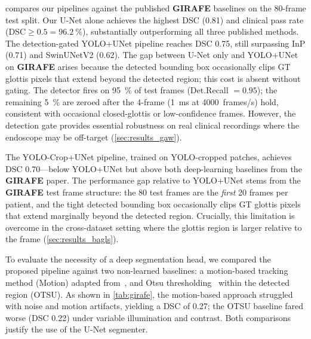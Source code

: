 \documentclass[preprint,12pt]{elsarticle}
\newcommand{\girafe}{\textbf{GIRAFE}}
\newcommand{\yolounet}{YOLO+UNet}
\newcommand{\yolocrop}{YOLO-Crop+UNet}
\begin{document}
 compares our pipelines against the published \girafe{}
baselines on the \num{80}-frame test split.
Our U-Net alone achieves the highest DSC (\num{0.81}) and clinical pass
rate (DSC${\geq}0.5 = \SI{96.2}{\%}$), substantially outperforming all
three published methods.
The detection-gated \yolounet{} pipeline reaches DSC \num{0.75},
still surpassing InP (\num{0.71}) and SwinUNetV2 (\num{0.62}).
The gap between U-Net only and \yolounet{} on \girafe{} arises because the
detected bounding box occasionally clips GT glottis pixels that extend beyond
the detected region; this cost is absent without gating.
The detector fires on \SI{95}{\%} of test frames (Det.Recall $= 0.95$);
the remaining \SI{5}{\%} are zeroed after the 4-frame (\SI{1}{ms} at \SI{4000}{frames/s}) hold, consistent with
occasional closed-glottis or low-confidence frames.
However, the detection gate provides essential robustness on real clinical
recordings where the endoscope may be off-target (\cref{sec:results_gaw}).

The \yolocrop{} pipeline, trained on YOLO-cropped patches, achieves DSC
\num{0.70}---below \yolounet{} but above both deep-learning baselines from
the \girafe{} paper.
The performance gap relative to \yolounet{} stems from the \girafe{} test
frame structure: the \num{80} test frames are the \emph{first} \num{20} frames
per patient, and the tight detected bounding box occasionally clips GT glottis
pixels that extend marginally beyond the detected region.
Crucially, this limitation is overcome in the cross-dataset setting where the
glottis region is larger relative to the frame (\cref{sec:results_bagls}).

To evaluate the necessity of a deep segmentation head, we compared the
proposed pipeline against two non-learned baselines: a motion-based
tracking method (Motion) adapted from~\cite{patel2015kinematic}, and
Otsu thresholding~\cite{otsu1979threshold} within the detected region (OTSU).
As shown in \cref{tab:girafe}, the motion-based approach struggled with
noise and motion artifacts, yielding a DSC of \num{0.27}; the OTSU baseline
fared worse (DSC \num{0.22}) under variable illumination and contrast.
Both comparisons justify the use of the U-Net segmenter.
\end{document}
